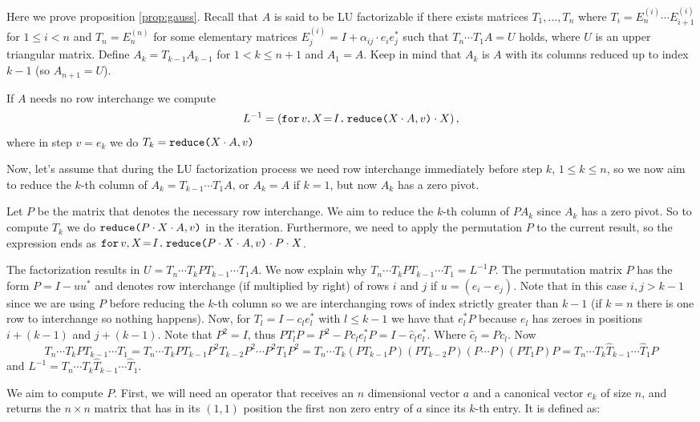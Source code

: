 Here we prove proposition \ref{prop:gauss}. Recall that $A$ is said to be LU factorizable if there exists matrices $T_1,\ldots, T_{n}$ where $T_i=E_{n}^{(i)}\cdots E_{i+1}^{(i)}$ for $1\leq i < n$ and $T_n=E^{(n)}_n$ for some elementary matrices $E_{j}^{(i)}=I+\alpha_{ij}\cdot e_{i}e_{j}^{*}$ such that $T_{n}\cdots T_1A=U$ holds, where $U$ is an upper triangular matrix. Define $A_k=T_{k-1}A_{k-1}$ for $1< k\leq n+1$ and $A_1=A$. Keep in mind that $A_k$ is $A$ with its columns reduced up to index $k-1$ (so $A_{n+1}=U$). 

If $A$ needs no row interchange we compute $$L^{-1}=\left( \initf{I}{v}{X}{\red{X\cdot A}{v}\cdot X} \right),$$ where in step $v=e_k$ we do $T_k=\red{X\cdot A}{v}$ 


Now, let's assume that during the LU factorization process we need row interchange immediately before step $k$, $1\leq k\leq n$, so we now aim to reduce the $k$-th column of $A_k=T_{k-1}\cdots T_1A$, or $A_k=A$ if $k=1$, but now $A_k$ has a zero pivot. 

Let $P$ be the matrix that denotes the necessary row interchange. We aim to reduce the $k$-th column of $PA_{k}$ since $A_{k}$ has a zero pivot. So to compute $T_k$ we do $\red{P\cdot X\cdot A}{v}$ in the iteration. Furthermore, we need to apply the permutation $P$ to the current result, so the expression ends as $\initf{I}{v}{X}{\red{P\cdot X\cdot A}{v}\cdot P\cdot X}$.

The factorization results in $U=T_{n}\cdots T_kPT_{k-1}\cdots T_1A$. We now explain why $T_{n}\cdots T_kPT_{k-1}\cdots T_1 = L^{-1}P.$ The permutation matrix $P$ has the form $P = I - uu^*$ and denotes row interchange (if multiplied by right) of rows $i$ and $j$ if $u=(e_{i}-e_{j})$. Note that in this case $i,j>k-1$ since we are using $P$ before reducing the $k$-th column so we are interchanging rows of index strictly greater than $k-1$ (if $k=n$ there is one row to interchange so nothing happens). Now, for $T_{l}=I-c_le_l^*$ with $l\leq k-1$ we have that $e_l^*P$ because $e_l$ has zeroes in positions $i+(k-1)$ and $j+(k-1)$. Note that $P^2=I$, thus $PT_lP=P^2-Pc_le_l^*P=I-\widehat{c}_le_l^*.$ Where $\widehat{c}_l=Pc_l$. Now $$T_{n}\cdots T_kPT_{k-1}\cdots T_1=T_{n}\cdots T_kPT_{k-1}P^2T_{k-2}P^2\cdots P^2 T_1P^2=T_{n}\cdots T_k(PT_{k-1}P)(PT_{k-2}P)(P\cdots P)(PT_1P)P=T_{n}\cdots T_k\widehat{T}_{k-1}\cdots \widehat{T}_1P$$ and $L^{-1} = T_{n}\cdots T_k\widehat{T}_{k-1}\cdots \widehat{T}_1$.

We aim to compute $P$. First, we will need an operator that receives an $n$ dimensional vector $a$ and a canonical vector $e_k$ of size $n$, and returns the $n\times n$ matrix that has in its $(1,1)$ position the first non zero entry of $a$ since its $k$-th entry. It is defined as:

